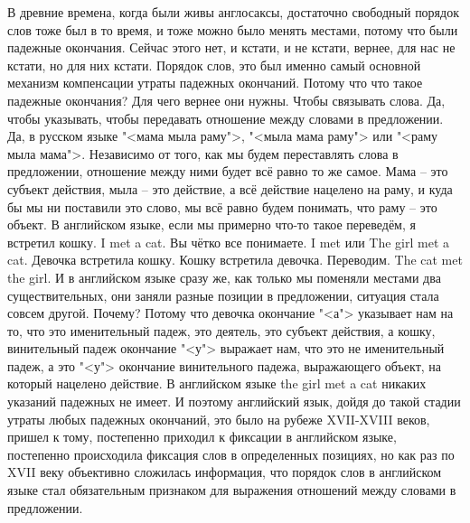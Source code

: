 \documentclass[main.tex]{subfiles}
\begin{document}
В древние времена, когда были живы англосаксы, достаточно свободный порядок слов тоже был в то время, и тоже можно было менять местами, потому что были падежные окончания.
Сейчас этого нет, и кстати, и не кстати, вернее, для нас не кстати, но для них кстати.
Порядок слов, это был именно самый основной механизм компенсации утраты падежных окончаний.
Потому что что такое падежные окончания?
Для чего вернее они нужны.
Чтобы связывать слова.
Да, чтобы указывать, чтобы передавать отношение между словами в предложении.
Да, в русском языке "<мама мыла раму">, "<мыла мама раму"> или "<раму мыла мама">.
Независимо от того, как мы будем переставлять слова в предложении, отношение между ними будет всё равно то же самое.
Мама -- это субъект действия, мыла -- это действие, а всё действие нацелено на раму, и куда бы мы ни поставили это слово, мы всё равно будем понимать, что раму -- это объект.
В английском языке, если мы примерно что-то такое переведём, я встретил кошку.
I met a cat.
Вы чётко все понимаете.
I met или The girl met a cat.
Девочка встретила кошку.
Кошку встретила девочка.
Переводим.
The cat met the girl.
И в английском языке сразу же, как только мы поменяли местами два существительных, они заняли разные позиции в предложении, ситуация стала совсем другой.
Почему?
Потому что девочка окончание "<а"> указывает нам на то, что это именительный падеж, это деятель, это субъект действия, а кошку, винительный падеж окончание "<у"> выражает нам, что это не именительный падеж, а это "<у"> окончание винительного падежа, выражающего объект, на который нацелено действие.
В английском языке the girl met a cat никаких указаний падежных не имеет.
И поэтому английский язык, дойдя до такой стадии утраты любых падежных окончаний, это было на рубеже XVII-XVIII веков, пришел к тому, постепенно приходил к фиксации в английском языке, постепенно происходила фиксация слов в определенных позициях, но как раз по XVII веку объективно сложилась информация, что порядок слов в английском языке стал обязательным признаком для выражения отношений между словами в предложении.
\end{document}
